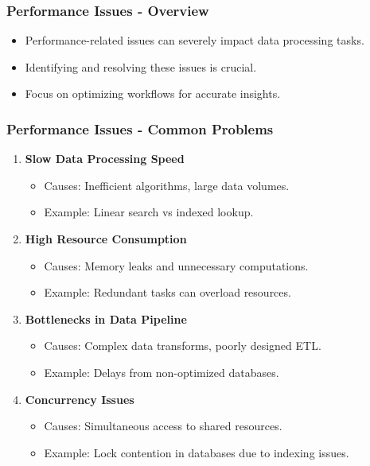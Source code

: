 \documentclass[aspectratio=169]{beamer}
\begin{document}
\begin{frame}[fragile]
    \frametitle{Performance Issues - Overview}
    \begin{itemize}
        \item Performance-related issues can severely impact data processing tasks.
        \item Identifying and resolving these issues is crucial.
        \item Focus on optimizing workflows for accurate insights.
    \end{itemize}
\end{frame}

\begin{frame}[fragile]
    \frametitle{Performance Issues - Common Problems}
    \begin{enumerate}
        \item \textbf{Slow Data Processing Speed}
            \begin{itemize}
                \item Causes: Inefficient algorithms, large data volumes.
                \item Example: Linear search vs indexed lookup.
            \end{itemize}

        \item \textbf{High Resource Consumption}
            \begin{itemize}
                \item Causes: Memory leaks and unnecessary computations.
                \item Example: Redundant tasks can overload resources.
            \end{itemize}

        \item \textbf{Bottlenecks in Data Pipeline}
            \begin{itemize}
                \item Causes: Complex data transforms, poorly designed ETL.
                \item Example: Delays from non-optimized databases.
            \end{itemize}

        \item \textbf{Concurrency Issues}
            \begin{itemize}
                \item Causes: Simultaneous access to shared resources.
                \item Example: Lock contention in databases due to indexing issues.
            \end{itemize}
    \end{enumerate}
\end{frame}
\end{document}

